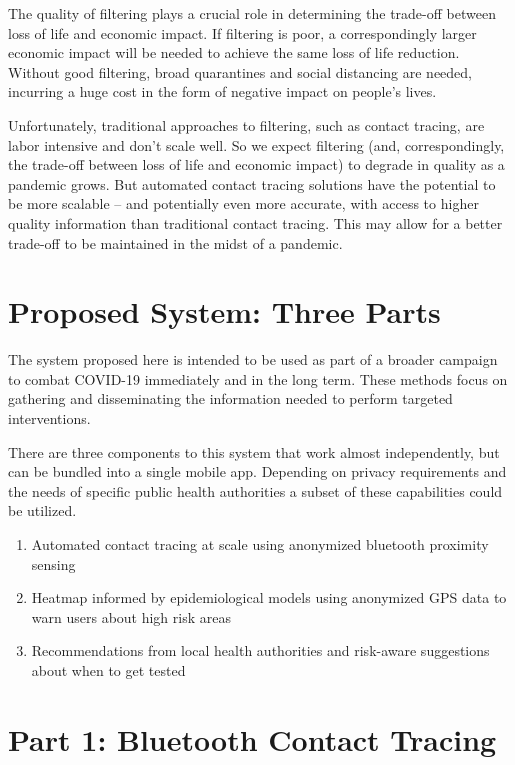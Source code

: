 \documentclass[11pt]{article}
\begin{document}
The quality of filtering plays a crucial role in determining the trade-off between loss of life and economic impact. If filtering is poor, a correspondingly larger economic impact will be needed to achieve the same loss of life reduction. Without good filtering, broad quarantines and social distancing are needed, incurring a huge cost in the form of negative impact on people’s lives.


Unfortunately, traditional approaches to filtering, such as contact tracing, are labor intensive and don’t scale well. So we expect filtering (and, correspondingly, the trade-off between loss of life and economic impact) to degrade in quality as a pandemic grows. But automated contact tracing solutions have the potential to be more scalable -- and potentially even more accurate, with access to higher quality information than traditional contact tracing. This may allow for a better trade-off to be maintained in the midst of a pandemic.




\section{Proposed System: Three Parts}

The system proposed here is intended to be used as part of a broader campaign to combat COVID-19 immediately and in the long term. These methods focus on gathering and disseminating the information needed to perform targeted interventions. 

There are three components to this system that work almost independently, but can be bundled into a single mobile app. Depending on privacy requirements and the needs of specific public health authorities a subset of these capabilities could be utilized.

\begin{enumerate}
  \item Automated contact tracing at scale using anonymized bluetooth proximity sensing 
  \item Heatmap informed by epidemiological models using anonymized GPS data to warn users about high risk areas
  \item Recommendations from local health authorities and risk-aware suggestions about when to get tested
\end{enumerate}

\section{Part 1: Bluetooth Contact Tracing}
\end{document}
